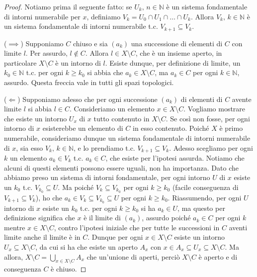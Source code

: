 \documentclass{article}
\begin{document}
\begin{proof}
	Notiamo prima il seguente fatto: se $U_k, \, n \in \mathbb{N}$ è un sistema
	fondamentale di intorni numerabile per $x$, definiamo $V_k=U_0 \cap U_1 \cap
	\dots \cap U_k$. Allora $V_k, \, k \in \mathbb{N}$ è un sistema fondamentale
	di intorni numerabile t.c. $V_{k+1} \subseteq V_k$.

	($\implies$) Supponiamo $C$ chiuso e sia $(a_k)$ una successione di elementi
	di $C$ con limite $l$. Per assurdo, $l \not\in C$. Allora $l \in X \setminus
	C$, che è un insieme aperto, in particolare $X \setminus C$ è un intorno di
	$l$. Esiste dunque, per definizione di limite, un $k_0 \in \mathbb{N}$ t.c.
	per ogni $k \ge k_0$ si abbia che $a_k \in X \setminus C$, ma $a_k \in C$
	per ogni $k \in \mathbb{N}$,
	assurdo. Questa freccia vale in tutti gli spazi topologici.

	($\Leftarrow$) Supponiamo adesso che per ogni successione $(a_k)$ di
	elementi di $C$ avente limite $l$ si abbia $l \in C$. Consideriamo un
	elemento $x \in X \setminus C$. Vogliamo mostrare che esiste un intorno
	$U_x$ di $x$ tutto contenuto in $X \setminus C$. Se così non fosse, per ogni
	intorno di $x$ esisterebbe un elemento di $C$ in esso contenuto. Poiché $X$
	è primo numerabile, consideriamo dunque un sistema fondamentale di intorni
	numerabile di $x$, sia esso $V_k, \, k \in \mathbb{N}$, e lo prendiamo t.c.
	$V_{k+1} \subseteq V_k$. Adesso scegliamo per ogni $k$ un elemento $a_k \in
	V_k$ t.c. $a_k \in C$, che esiste per l'ipotesi assurda. Notiamo che alcuni
	di questi elementi possono essere uguali, non ha importanza. Dato che
	abbiamo preso un sistema di intorni fondamentale, per ogni intorno $U$ di
	$x$ esiste un $k_0$ t.c. $V_{k_0} \subseteq U$. Ma poiché $V_k \subseteq V_
	{k_0}$ per ogni $k \ge k_0$ (facile conseguenza di $V_{k+1} \subseteq V_k$),
	ho che $a_k \in V_k \subseteq V_{k_0} \subseteq U$ per ogni $k \ge k_0$.
	Riassumendo, per ogni $U$ intorno di $x$ esiste un $k_0$ t.c. per ogni $k
	\ge k_0$ si ha $a_k \in U$, ma questo per definizione significa che $x$ è il
	limite di $(a_k)$, assurdo poiché $a_k \in C$ per ogni $k$ mentre $x \in X
	\setminus C$, contro l'ipotesi iniziale che per tutte le successioni in $C$
	aventi limite anche il limite è in $C$. Dunque per ogni $x \in X \setminus
	C$ esiste un intorno $U_x \subseteq X \setminus C$, da cui si ha che esiste
	un aperto $A_x$ con $x \in A_x \subseteq U_x \subseteq X \setminus C$. Ma
	allora, $\displaystyle X \setminus C=\bigcup_{x \in X \setminus C} A_x$ che
	un'unione di aperti, perciò $X \setminus C$ è aperto e di conseguenza $C$ è
	chiuso.
\end{proof}
\end{document}
